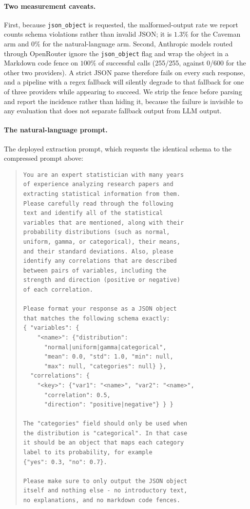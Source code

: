\paragraph{Two measurement caveats.} First, because \texttt{json\_object} is
requested, the malformed-output rate we report counts schema violations rather
than invalid JSON; it is $1.3\%$ for the Caveman arm and $0\%$ for the
natural-language arm. Second, Anthropic models routed through OpenRouter ignore
the \texttt{json\_object} flag and wrap the object in a Markdown code fence on
$100\%$ of successful calls (255/255, against 0/600 for the other two providers).
A strict JSON parse therefore fails on every such response, and a pipeline with a
regex fallback will silently degrade to that fallback for one of three providers
while appearing to succeed. We strip the fence before parsing and report the
incidence rather than hiding it, because the failure is invisible to any
evaluation that does not separate fallback output from LLM output.

\paragraph{The natural-language prompt.} The deployed extraction prompt, which
requests the identical schema to the compressed prompt above:

\begin{quote}\begin{scriptsize}\begin{verbatim}
You are an expert statistician with many years
of experience analyzing research papers and
extracting statistical information from them.
Please carefully read through the following
text and identify all of the statistical
variables that are mentioned, along with their
probability distributions (such as normal,
uniform, gamma, or categorical), their means,
and their standard deviations. Also, please
identify any correlations that are described
between pairs of variables, including the
strength and direction (positive or negative)
of each correlation.

Please format your response as a JSON object
that matches the following schema exactly:
{ "variables": {
    "<name>": {"distribution":
      "normal|uniform|gamma|categorical",
      "mean": 0.0, "std": 1.0, "min": null,
      "max": null, "categories": null} },
  "correlations": {
    "<key>": {"var1": "<name>", "var2": "<name>",
      "correlation": 0.5,
      "direction": "positive|negative"} } }

The "categories" field should only be used when
the distribution is "categorical". In that case
it should be an object that maps each category
label to its probability, for example
{"yes": 0.3, "no": 0.7}.

Please make sure to only output the JSON object
itself and nothing else - no introductory text,
no explanations, and no markdown code fences.
\end{verbatim}\end{scriptsize}\end{quote}

